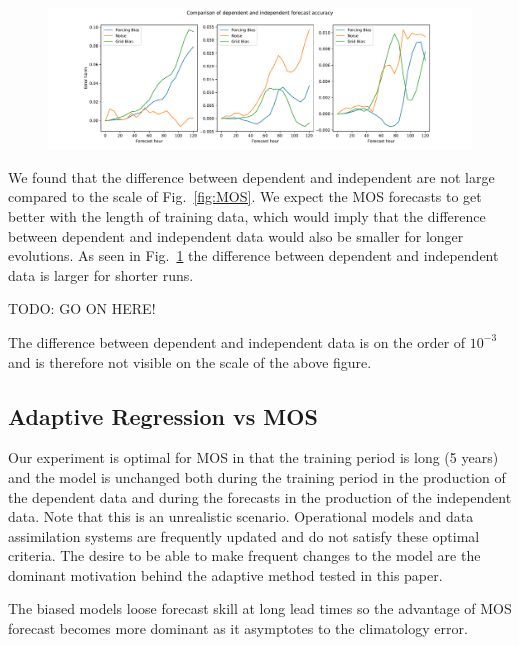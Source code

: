 \documentclass[10pt]{article}
\newcommand{\todo}[1]{{\color{red} TODO: {#1}}}
\begin{document}
\begin{figure}[ht]
	\center
	\includegraphics[width=\columnwidth]{figs/DepIndep}
	\caption{}
	\label{fig:indep}
\end{figure}


We found that the difference between dependent and independent are not large compared to the scale of Fig.~\ref{fig:MOS}. We expect the MOS forecasts to get better with the length of training data, which would imply that the difference between dependent and independent data would also be smaller for longer evolutions. As seen in Fig.~\ref{fig:indep} the difference between dependent and independent data is larger for shorter runs.  





\todo{GO ON HERE!}

The difference between dependent and independent data is on the order of $10^{-3}$ and is therefore not visible on the scale of the above figure. 



\subsection{Adaptive Regression vs MOS}

Our experiment is optimal for MOS in that the training period is long (5 years) and the model is unchanged both during the training period in the production of the dependent data and during the forecasts in the production of the independent data. Note that this is an unrealistic scenario. Operational models and data assimilation systems are frequently updated and do not satisfy these optimal criteria. The desire to be able to make frequent changes to the model are the dominant motivation behind the adaptive method tested in this paper.  




The biased models loose forecast skill at long lead times so the advantage of MOS forecast becomes more dominant as it asymptotes to the climatology error. 
\end{document}
